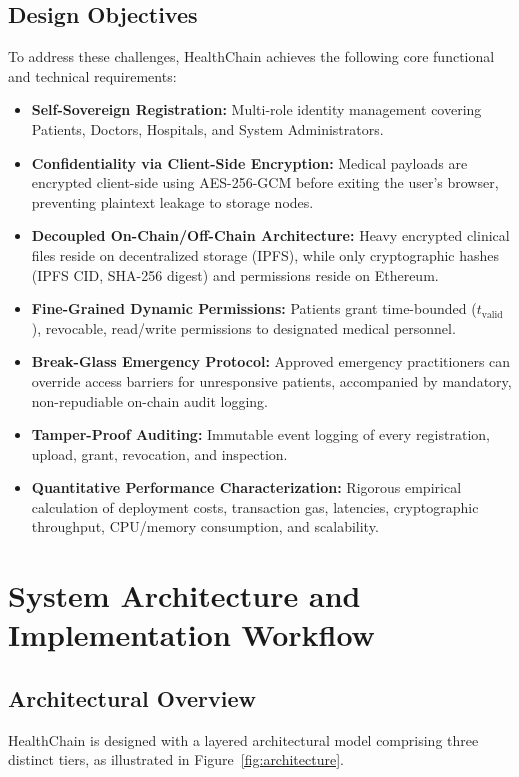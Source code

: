 \documentclass[11pt,a4paper]{article}
\begin{document}
\subsection{Design Objectives}
To address these challenges, HealthChain achieves the following core functional and technical requirements:
\begin{itemize}[leftmargin=1.5cm]
    \item \textbf{Self-Sovereign Registration:} Multi-role identity management covering Patients, Doctors, Hospitals, and System Administrators.
    \item \textbf{Confidentiality via Client-Side Encryption:} Medical payloads are encrypted client-side using AES-256-GCM before exiting the user's browser, preventing plaintext leakage to storage nodes.
    \item \textbf{Decoupled On-Chain/Off-Chain Architecture:} Heavy encrypted clinical files reside on decentralized storage (IPFS), while only cryptographic hashes (IPFS CID, SHA-256 digest) and permissions reside on Ethereum.
    \item \textbf{Fine-Grained Dynamic Permissions:} Patients grant time-bounded ($t_{\text{valid}}$), revocable, read/write permissions to designated medical personnel.
    \item \textbf{Break-Glass Emergency Protocol:} Approved emergency practitioners can override access barriers for unresponsive patients, accompanied by mandatory, non-repudiable on-chain audit logging.
    \item \textbf{Tamper-Proof Auditing:} Immutable event logging of every registration, upload, grant, revocation, and inspection.
    \item \textbf{Quantitative Performance Characterization:} Rigorous empirical calculation of deployment costs, transaction gas, latencies, cryptographic throughput, CPU/memory consumption, and scalability.
\end{itemize}

\section{System Architecture and Implementation Workflow}

\subsection{Architectural Overview}
HealthChain is designed with a layered architectural model comprising three distinct tiers, as illustrated in Figure~\ref{fig:architecture}.
\end{document}
